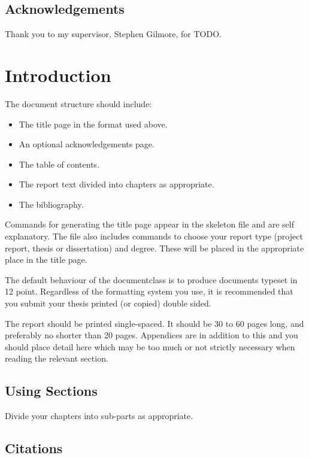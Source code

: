 \documentclass[bsc,frontabs,twoside,singlespacing,parskip,deptreport]{infthesis}     %
\begin{document}
\section*{Acknowledgements}
Thank you to my supervisor, Stephen Gilmore, for TODO.

\tableofcontents



\chapter{Introduction}

The document structure should include:
\begin{itemize}
\item
The title page  in the format used above.
\item
An optional acknowledgements page.
\item
The table of contents.
\item
The report text divided into chapters as appropriate.
\item
The bibliography.
\end{itemize}

Commands for generating the title page appear in the skeleton file and
are self explanatory.
The file also includes commands to choose your report type (project
report, thesis or dissertation) and degree.
These will be placed in the appropriate place in the title page.

The default behaviour of the documentclass is to produce documents typeset in
12 point.  Regardless of the formatting system you use,
it is recommended that you submit your thesis printed (or copied)
double sided.

The report should be printed single-spaced.
It should be 30 to 60 pages long, and preferably no shorter than 20 pages.
Appendices are in addition to this and you should place detail
here which may be too much or not strictly necessary when reading the relevant section.

\section{Using Sections}

Divide your chapters into sub-parts as appropriate.

\section{Citations}
\end{document}
